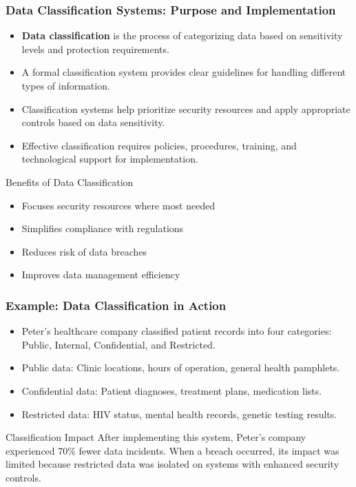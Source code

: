 \documentclass{beamer}
\begin{document}
\begin{frame}
\frametitle{Data Classification Systems: Purpose and Implementation}
\begin{itemize}
\item \textbf{Data classification} is the process of categorizing data based on sensitivity levels and protection requirements.
\item A formal classification system provides clear guidelines for handling different types of information.
\item Classification systems help prioritize security resources and apply appropriate controls based on data sensitivity.
\item Effective classification requires policies, procedures, training, and technological support for implementation.
\end{itemize}

\begin{block}{Benefits of Data Classification}
\begin{itemize}
\item Focuses security resources where most needed
\item Simplifies compliance with regulations
\item Reduces risk of data breaches
\item Improves data management efficiency
\end{itemize}
\end{block}
\end{frame}

\begin{frame}
    \frametitle{Example: Data Classification in Action}
    \begin{itemize}
        \item Peter's healthcare company classified patient records into four categories: Public, Internal, Confidential, and Restricted.
        \item Public data: Clinic locations, hours of operation, general health pamphlets.
        \item Confidential data: Patient diagnoses, treatment plans, medication lists.
        \item Restricted data: HIV status, mental health records, genetic testing results.
    \end{itemize}
    
    \begin{exampleblock}{Classification Impact}
    After implementing this system, Peter's company experienced 70\% fewer data incidents. When a breach occurred, its impact was limited because restricted data was isolated on systems with enhanced security controls.
    \end{exampleblock}
    \end{frame}
\end{document}
